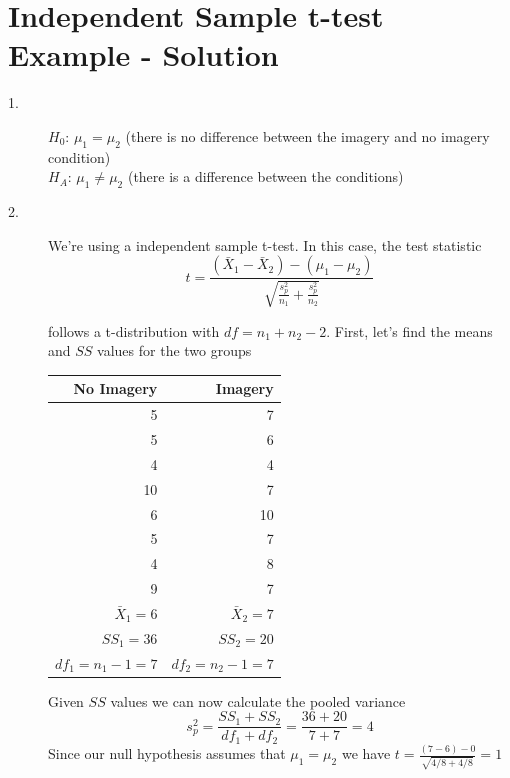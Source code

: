 \documentclass{tufte-handout}
\begin{document}
\pagebreak

\section{Independent Sample t-test Example - Solution}

\begin{fullwidth}
\begin{description}
\item[1.] $H_0$: $\mu_1=\mu_2$ (there is no difference between the imagery and no imagery condition)\\
$H_A$: $\mu_1\neq \mu_2$ (there is a difference between the conditions)

\item[2.] We're using a independent sample t-test. In this case, the test statistic
\begin{equation*}
t=\frac{(\bar{X}_1-\bar{X}_2)-(\mu_1-\mu_2)}{\sqrt{\frac{s_p^2}{n_1} + \frac{s_p^2}{n_2}}}
\end{equation*}

follows a t-distribution with  $df=n_1+n_2-2$. First, let's find the means and $SS$ values for the two groups

\begin{table}
  \centering
  \selectfont
  \begin{tabular}{rr}
    \toprule
No Imagery & Imagery\\
    \midrule
5&	7\\
5&	6\\
4&	4\\
10&	7\\
6&	10\\
5&	7\\
4&	8\\
9&	7\\
    \bottomrule
$\bar{X}_1=6$& $\bar{X}_2=7$\\
$SS_1=36$& $SS_2=20$\\
$df_1=n_1-1=7$& $df_2=n_2-1=7$\\
    \bottomrule
  \end{tabular}
  \label{tab:normaltab}
\end{table}
\vspace{20pt}
Given $SS$ values we can now calculate the pooled variance
\begin{equation*}
s_p^2=\frac{SS_1+SS_2}{df_1+df_2}=\frac{36+20}{7+7}=4
\end{equation*}
Since our null hypothesis assumes that $\mu_1=\mu_2$ we have $t=\frac{(7-6)-0}{\sqrt{4/8+4/8}}=1$


\end{description}
\end{fullwidth}
\end{document}
